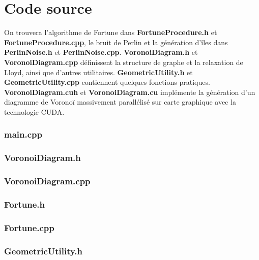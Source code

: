 \documentclass[a4paper, 10pt]{article}
\begin{document}
\section{Code source}  
On trouvera l'algorithme de Fortune dans \textbf{FortuneProcedure.h} et \textbf{FortuneProcedure.cpp}, le bruit de Perlin et la génération d'îles dans \textbf{PerlinNoise.h} et \textbf{PerlinNoise.cpp}. \textbf{VoronoiDiagram.h} et \textbf{VoronoiDiagram.cpp} définissent la structure de graphe et la relaxation de Lloyd, ainsi que d'autres utilitaires. \textbf{GeometricUtility.h} et \textbf{GeometricUtility.cpp} contiennent quelques fonctions pratiques. \textbf{VoronoiDiagram.cuh} et \textbf{VoronoiDiagram.cu} implémente la génération d'un diagramme de Voronoï massivement parallélisé sur carte graphique avec la technologie CUDA. 
\subsubsection{main.cpp}

\newpage
\subsubsection{VoronoiDiagram.h}

\newpage
\subsubsection{VoronoiDiagram.cpp}

\newpage
\subsubsection{Fortune.h}

\subsubsection{Fortune.cpp}

\newpage
\subsubsection{GeometricUtility.h}

\end{document}
